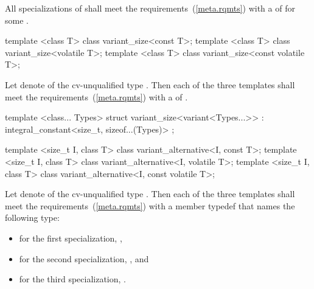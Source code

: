 \begin{itemdescr}
\pnum
\remarks
All specializations of  shall meet the
 requirements~(\ref{meta.rqmts}) with a  of  for some .
\end{itemdescr}

%
\begin{itemdecl}
template <class T> class variant_size<const T>;
template <class T> class variant_size<volatile T>;
template <class T> class variant_size<const volatile T>;
\end{itemdecl}

\begin{itemdescr}
\pnum
Let  denote  of the cv-unqualified
type . Then each of the three templates shall meet the
 requirements~(\ref{meta.rqmts}) with a
 of .
\end{itemdescr}

%
\begin{itemdecl}
template <class... Types>
struct variant_size<variant<Types...>>
  : integral_constant<size_t, sizeof...(Types)> { };
\end{itemdecl}

%
\begin{itemdecl}
template <size_t I, class T> class variant_alternative<I, const T>;
template <size_t I, class T> class variant_alternative<I, volatile T>;
template <size_t I, class T> class variant_alternative<I, const volatile T>;
\end{itemdecl}

\begin{itemdescr}
\pnum
Let  denote  of the
cv-unqualified type . Then each of the three templates shall
meet the  requirements~(\ref{meta.rqmts}) with a
member typedef  that names the following type:
\begin{itemize}
\item for the first specialization, ,
\item for the second specialization, , and
\item for the third specialization, .
\end{itemize}
\end{itemdescr}


